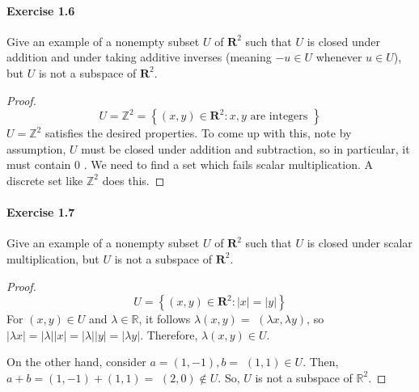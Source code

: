 \documentclass{article}
\theoremstyle{definition}
\begin{document}
\paragraph{Exercise 1.6} Give an example of a nonempty subset $U$ of $\mathbf{R}^2$ such that $U$ is closed under addition and under taking additive inverses (meaning $-u \in U$ whenever $u \in U$), but $U$ is not a subspace of $\mathbf{R}^2$.
\begin{proof}
    \[U=\mathbb{Z}^2=\left\{(x, y) \in \mathbf{R}^2: x, y \text { are integers }\right\}\]
$U=\mathbb{Z}^2$ satisfies the desired properties. To come up with this, note by assumption, $U$ must be closed under addition and subtraction, so in particular, it must contain 0 . We need to find a set which fails scalar multiplication. A discrete set like $\mathbb{Z}^2$ does this.
\end{proof}



\paragraph{Exercise 1.7} Give an example of a nonempty subset $U$ of $\mathbf{R}^2$ such that $U$ is closed under scalar multiplication, but $U$ is not a subspace of $\mathbf{R}^2$.
\begin{proof}
$$
U=\left\{(x, y) \in \mathbf{R}^2:|x|=|y|\right\}
$$
For $(x, y) \in U$ and $\lambda \in \mathbb{R}$, it follows $\lambda(x, y)=$ $(\lambda x, \lambda y)$, so $|\lambda x|=|\lambda||x|=|\lambda||y|=|\lambda y|$. Therefore, $\lambda(x, y) \in U$.

On the other hand, consider $a=(1,-1), b=$ $(1,1) \in U$. Then, $a+b=(1,-1)+(1,1)=$ $(2,0) \notin U$. So, $U$ is not a subspace of $\mathbb{R}^2$.
\end{proof}
\end{document}
